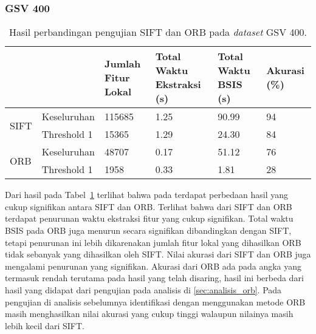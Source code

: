 \subsubsection{GSV 400}
\begin{table}[H]
	\centering
	\begin{tabular}{|p{}|p{}|p{}|p{}|p{}|p{}|}
		\hline
		&            & \textbf{Jumlah Fitur Lokal} & \textbf{Total Waktu Ekstraksi (s)} & \textbf{Total Waktu BSIS (s)} & \textbf{Akurasi (\%)} \\ \hline
		\multicolumn{1}{|l|}{\multirow{2}{*}{SIFT}} & Keseluruhan & 115685 & 1.25                            & 90.99                         & 94                    \\ \cline{2-6} 
		\multicolumn{1}{|l|}{}                      & Threshold 1 & 15365 & 1.29                            & 24.30                         & 84                    \\ \hline
		\multirow{2}{*}{ORB}                        & Keseluruhan & 48707 & 0.17                            & 51.12                         & 76                    \\ \cline{2-6} 
		& Threshold 1 & 1958 & 0.33                            & 1.81                          & 28                    \\ \hline
	\end{tabular}
	\caption{Hasil perbandingan pengujian SIFT dan ORB pada \textit{dataset} GSV 400.}
	\label{tab:perbandingan_gsv400}
\end{table}
Dari hasil pada Tabel~\ref{tab:perbandingan_gsv400} terlihat bahwa pada terdapat perbedaan hasil yang cukup signifikan antara SIFT dan ORB. Terlihat bahwa dari SIFT dan ORB terdapat penurunan waktu ekstraksi fitur yang cukup signifikan. Total waktu BSIS pada ORB juga menurun secara signifikan dibandingkan dengan SIFT, tetapi penurunan ini lebih dikarenakan jumlah fitur lokal yang dihasilkan ORB tidak sebanyak yang dihasilkan oleh SIFT. Nilai akurasi dari SIFT dan ORB juga mengalami penurunan yang signifikan. Akurasi dari ORB ada pada angka yang termasuk rendah terutama pada hasil yang telah disaring, hasil ini berbeda dari hasil yang didapat dari pengujian pada analisis di \ref{sec:analisis_orb}. Pada pengujian di analisis sebelumnya identifikasi dengan menggunakan metode ORB masih menghasilkan nilai akurasi yang cukup tinggi walaupun nilainya masih lebih kecil dari SIFT.

